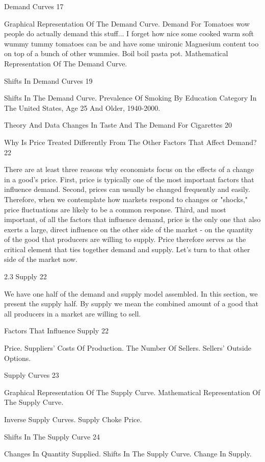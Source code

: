 Demand Curves 17

Graphical Representation Of The Demand Curve. Demand For Tomatoes wow people do actually demand this stuff... I forget how nice some cooked warm soft wummy tummy tomatoes can be and have some unironic Magnesium content too on top of a bunch of other wummies. Boil boil pasta pot. Mathematical Representation Of The Demand Curve.

Shifts In Demand Curves 19

Shifts In The Demand Curve. Prevalence Of Smoking By Education Category In The United States, Age 25 And Older, 1940-2000.

Theory And Data Changes In Taste And The Demand For Cigarettes 20



Why Is Price Treated Differently From The Other Factors That Affect Demand? 22

There are at least three reasons why economists focus on the effects of a change in a good's price. First, price is typically one of the most important factors that influence demand. Second, prices can usually be changed frequently and easily. Therefore, when we contemplate how markets respond to changes or "shocks," price fluctuations are likely to be a common response. Third, and most important, of all the factors that influence demand, price is the only one that also exerts a large, direct influence on the other side of the market - on the quantity of the good that producers are willing to supply. Price therefore serves as the critical element that ties together demand and supply. Let's turn to that other side of the market now.

2.3 Supply 22

We have one half of the demand and supply model assembled. In this section, we present the supply half. By supply we mean the combined amount of a good that all producers in a market are willing to sell.

Factors That Influence Supply 22

Price. Suppliers' Costs Of Production. The Number Of Sellers. Sellers' Outside Options.

Supply Curves 23

Graphical Representation Of The Supply Curve. Mathematical Representation Of The Supply Curve.

Inverse Supply Curves. Supply Choke Price.

Shifts In The Supply Curve 24

Changes In Quantity Supplied. Shifts In The Supply Curve. Change In Supply.

